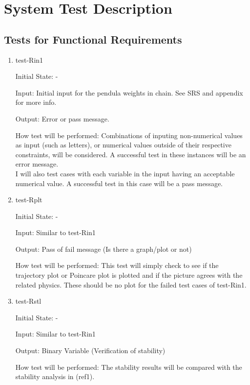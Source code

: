 \documentclass[12pt, titlepage]{article}
\begin{document}


\section{System Test Description}
	
\subsection{Tests for Functional Requirements}

\begin{enumerate}
\item{test-Rin1}	
				
Initial State: -
					
Input: Initial input for the pendula weights in chain. See SRS and appendix for more info.
					
Output: Error or pass message.
					
How test will be performed: Combinations of inputing non-numerical values as 
input  (such as letters), or numerical values outside of their respective 
constraints, will be considered. A successful test in these instances will be 
an error message. \\
I will also test cases with each variable in the input having an 
acceptable numerical value. A successful test in this case will be a pass 
message. 
					
\item{test-Rplt} 

Initial State: -

Input: Similar to test-Rin1 

Output: Pass of fail message (Is there a graph/plot or not)

How test will be performed: This test will simply check to see if the trajectory plot or
Poincare plot is plotted and if the picture agrees with the related physics.
These should be no plot for the failed test cases of test-Rin1. 

\item{test-Rstl} 

Initial State: -

Input: Similar to test-Rin1 

Output: Binary Variable (Verification of stability) 

How test will be performed: The stability results will be compared with the 
stability analysis in (ref1). 

\end{enumerate}
\end{document}

